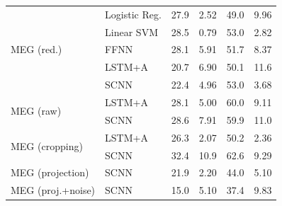 \documentclass[fleqn,10pt]{wlscirep}
\begin{document}
\begin{table}[htp]
{\begin{tabular}{l l| c | c | c | c}
    \midrule
    \multirow{5}{*}{MEG (red.)}
                     & Logistic Reg.        & 27.9 & 2.52  & 49.0 & 9.96 \\
                     & Linear SVM          & 28.5 & 0.79  & 53.0 & 2.82 \\
                     & FFNN                & 28.1 & 5.91  & 51.7 & 8.37 \\
                     & LSTM+A              & 20.7 & 6.90  & 50.1 & 11.6 \\
                     & SCNN                & 22.4 & 4.96  & 53.0 & 3.68 \\
    \midrule
    \multirow{2}{*}{MEG (raw)}
                         & LSTM+A              & 28.1 & 5.00 & 60.0 & 9.11 \\ 
                         & SCNN                & 28.6 & 7.91 & 59.9 & 11.0 \\
    \midrule
    \multirow{2}{*}{MEG (cropping)}
                         & LSTM+A              & 26.3 & 2.07 & 50.2 & 2.36 \\ 
                         & SCNN                & 32.4 & 10.9 & 62.6 & 9.29 \\
    \midrule
    \multirow{1}{*}{MEG (projection)}
                         & SCNN                & 21.9 & 2.20 & 44.0 & 5.10 \\
    \midrule
    \multirow{1}{*}{MEG (proj.+noise)}
                         & SCNN                & 15.0 & 5.10 & 37.4 & 9.83 \\
    \bottomrule
  \end{tabular}}
  \label{tab:seven_way_results}
\end{table}
\end{document}
